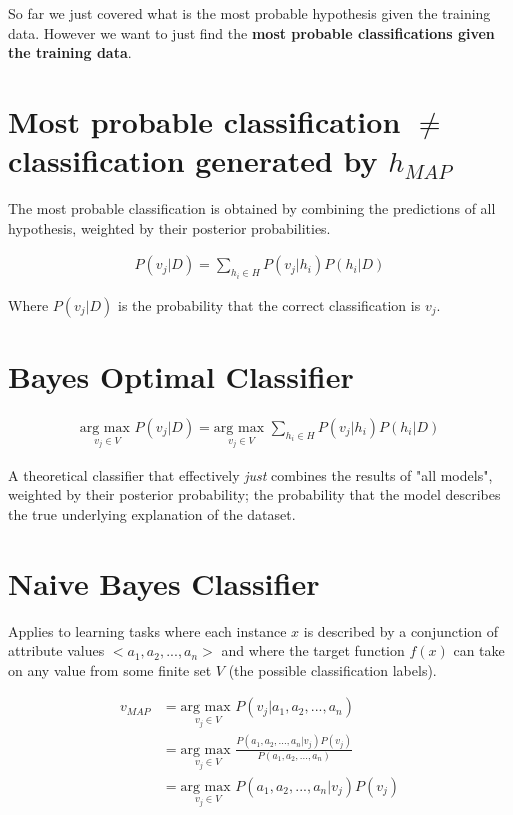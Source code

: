 \documentclass{article}
\begin{document}
So far we just covered what is the most probable hypothesis given the training data. However we want to just find the {\bf most probable classifications given the training data}.

\section*{Most probable classification $\not =$ classification generated by $h_{MAP}$}
The most probable classification is obtained by combining the predictions of all hypothesis, weighted by their posterior probabilities.

\begin{align*}
	P(v_j | D) = \sum_{h_i \in H}P(v_j|h_i)P(h_i|D)
\end{align*}

Where $P(v_j|D)$ is the probability that the correct classification is $v_j$.

\section*{Bayes Optimal Classifier}
\begin{align*}
	\underset{v_j \in V}{\text{arg max }} P( v_j | D) = \underset{{v_j \in V}}{\text{arg max }} \sum_{h_i \in H} P(v_j|h_i)P(h_i|D)
\end{align*}

A theoretical classifier that effectively {\em just} combines the results of "all models", weighted by their posterior probability; the probability that the model describes the true underlying explanation of the dataset.

\section*{Naive Bayes Classifier}
Applies to learning tasks where each instance $x$ is described by a conjunction of attribute values $<a_1, a_2, ..., a_n>$ and where the target function $f(x)$ can take on any value from some finite set $V$ (the possible classification labels).

\begin{align*}
	v_{MAP} &= \underset{v_j \in V}{\text{arg max }} P(v_j | a_1, a_2, ..., a_n) \\
					&= \underset{v_j \in V}{\text{arg max }} \frac{P(a_1, a_2, ..., a_n | v_j)P(v_j)}{P(a_1, a_2, ..., a_n)} \\
					&= \underset{v_j \in V}{\text{arg max }} P(a_1, a_2, ..., a_n | v_j)P(v_j)
\end{align*}
\end{document}
